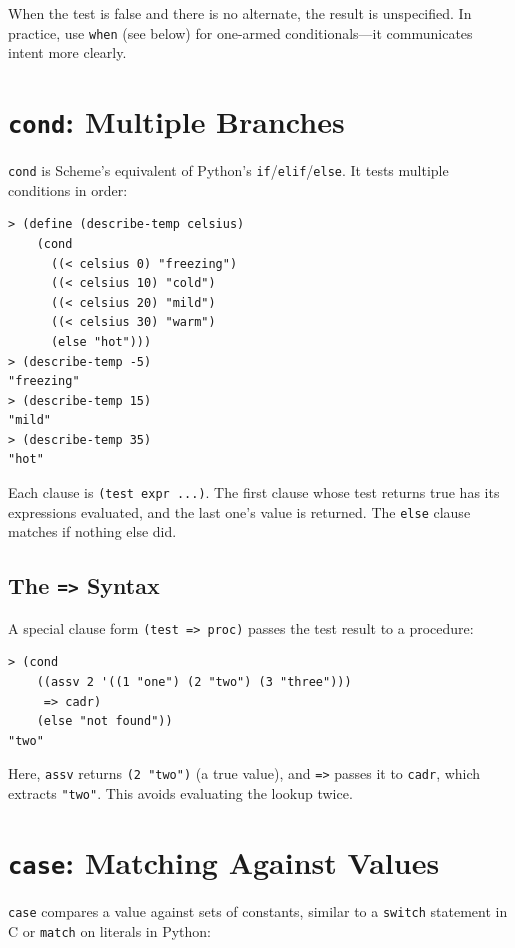When the test is false and there is no alternate, the result is unspecified. In practice, use \texttt{when} (see below) for one-armed conditionals---it communicates intent more clearly.

\section{\texttt{cond}: Multiple Branches}

\texttt{cond} is Scheme's equivalent of Python's \texttt{if}/\texttt{elif}/\texttt{else}. It tests multiple conditions in order:

\begin{lstlisting}[style=repl]
> (define (describe-temp celsius)
    (cond
      ((< celsius 0) "freezing")
      ((< celsius 10) "cold")
      ((< celsius 20) "mild")
      ((< celsius 30) "warm")
      (else "hot")))
> (describe-temp -5)
"freezing"
> (describe-temp 15)
"mild"
> (describe-temp 35)
"hot"
\end{lstlisting}

Each clause is \texttt{(test expr ...)}. The first clause whose test returns true has its expressions evaluated, and the last one's value is returned. The \texttt{else} clause matches if nothing else did.

\subsection{The \texttt{=>} Syntax}

A special clause form \texttt{(test => proc)} passes the test result to a procedure:

\begin{lstlisting}[style=repl]
> (cond
    ((assv 2 '((1 "one") (2 "two") (3 "three")))
     => cadr)
    (else "not found"))
"two"
\end{lstlisting}

Here, \texttt{assv} returns \texttt{(2 "two")} (a true value), and \texttt{=>} passes it to \texttt{cadr}, which extracts \texttt{"two"}. This avoids evaluating the lookup twice.

\section{\texttt{case}: Matching Against Values}

\texttt{case} compares a value against sets of constants, similar to a \texttt{switch} statement in C or \texttt{match} on literals in Python:

